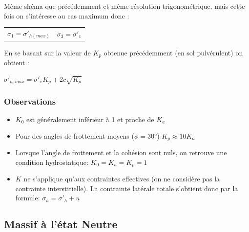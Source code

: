             Même shéma que précédemment et même résolution trigonométrique, mais cette fois on s'intéresse au cas maximum donc : 
            
            \begin{center}
            \begin{tabular}{cc}
                $\sigma_1 = \sigma'_{h(max)}$ \: \:&
                $\sigma_3 = \sigma'_v$ 
            \end{tabular}
            \end{center}
            
            En se basant sur la valeur de $K_p$ obtenue précédemment (en sol pulvérulent) on obtient :
            
            \begin{center}
                $\sigma'_{h,max} = \sigma'_v K_p + 2 c \sqrt{K_p}$
            \end{center}
            
        \subsubsection{Observations}
        
            \begin{itemize}
                \item $K_0$ est généralement inférieur à 1 et proche de $K_a$
                \item Pour des angles de frottement moyens ($\phi = 30°$) $K_p \approx 10 K_a$
                \item Lorsque l'angle de frottement et la cohésion sont nuls, on retrouve une condition hydrostatique: $K_0 = K_a = K_p = 1$
                \item $K$ ne s'applique qu'aux contraintes effectives (on ne considère pas la contrainte interstitielle). La contrainte latérale totale s'obtient donc par la formule: $\sigma_h = \sigma'_h + u$
            \end{itemize}
            
    \subsection{Massif à l'état Neutre}
            
